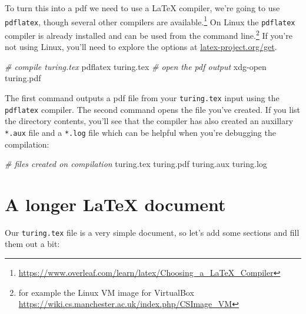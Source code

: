 \documentclass[
]{book}
\newenvironment{Shaded}{\begin{snugshade}}{\end{snugshade}}
\newcommand{\CommentTok}[1]{\textcolor[rgb]{0.56,0.35,0.01}{\textit{#1}}}
\newcommand{\NormalTok}[1]{#1}
\newcommand{\SpecialCharTok}[1]{\textcolor[rgb]{0.00,0.00,0.00}{#1}}
\begin{document}
To turn this into a pdf we need to use a LaTeX compiler, we're going to use \texttt{pdflatex}, though several other compilers are available.\footnote{\url{https://www.overleaf.com/learn/latex/Choosing_a_LaTeX_Compiler}} On Linux the \texttt{pdflatex} compiler is already installed and can be used from the command line.\footnote{for example the Linux VM image for VirtualBox \url{https://wiki.cs.manchester.ac.uk/index.php/CSImage_VM}} If you're not using Linux, you'll need to explore the options at \href{https://www.latex-project.org/get/}{latex-project.org/get}.

\begin{Shaded}
\begin{Highlighting}[]
\CommentTok{\# compile turing.tex}
\NormalTok{pdflatex turing.tex}
\CommentTok{\# open the pdf output}
\NormalTok{xdg}\SpecialCharTok{{-}}\NormalTok{open turing.pdf}
\end{Highlighting}
\end{Shaded}

The first command outputs a pdf file from your \texttt{turing.tex} input using the \texttt{pdflatex} compiler. The second command opens the file you've created. If you list the directory contents, you'll see that the compiler has also created an auxillary \texttt{*.aux} file and a \texttt{*.log} file which can be helpful when you're debugging the compilation:

\begin{Shaded}
\begin{Highlighting}[]
\CommentTok{\# files created on compilation}
\NormalTok{turing.tex}
\NormalTok{turing.pdf}
\NormalTok{turing.aux}
\NormalTok{turing.log}
\end{Highlighting}
\end{Shaded}

\hypertarget{longer}{%
\section{A longer LaTeX document}\label{longer}}

Our \texttt{turing.tex} file is a very simple document, so let's add some sections and fill them out a bit:
\end{document}
